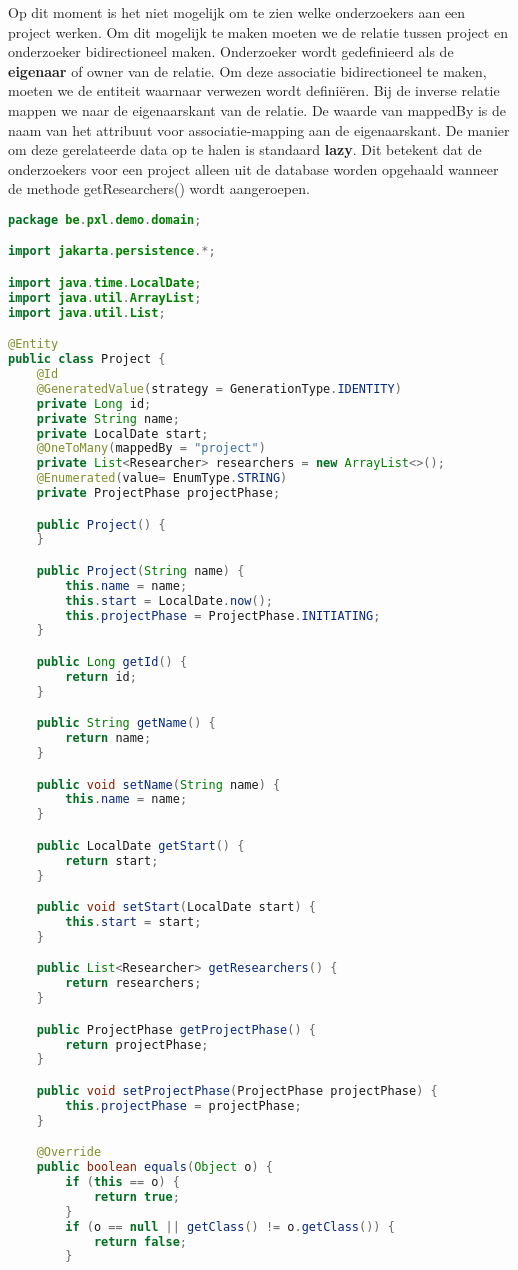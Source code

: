 Op dit moment is het niet mogelijk om te zien welke onderzoekers aan een project werken. Om dit mogelijk te maken moeten we de relatie tussen project en onderzoeker bidirectioneel maken. Onderzoeker wordt gedefinieerd als de \textbf{eigenaar} of owner van de relatie. Om deze associatie bidirectioneel te maken, moeten we de entiteit waarnaar verwezen wordt definiëren.  Bij de inverse relatie mappen we naar de eigenaarskant van de relatie.  De waarde van mappedBy is de naam van het attribuut voor associatie-mapping aan de eigenaarskant.  De manier om deze gerelateerde data op te halen is standaard \textbf{lazy}.  Dit betekent dat de onderzoekers voor een project alleen uit de database worden opgehaald wanneer de methode getResearchers() wordt aangeroepen.


\begin{lstlisting}[frame=single, language=java]
package be.pxl.demo.domain;

import jakarta.persistence.*;

import java.time.LocalDate;
import java.util.ArrayList;
import java.util.List;

@Entity
public class Project {
	@Id
	@GeneratedValue(strategy = GenerationType.IDENTITY)
	private Long id;
	private String name;
	private LocalDate start;
	@OneToMany(mappedBy = "project")
	private List<Researcher> researchers = new ArrayList<>();
	@Enumerated(value= EnumType.STRING)
	private ProjectPhase projectPhase;

	public Project() {
	}

	public Project(String name) {
		this.name = name;
		this.start = LocalDate.now();
		this.projectPhase = ProjectPhase.INITIATING;
	}

	public Long getId() {
		return id;
	}

	public String getName() {
		return name;
	}

	public void setName(String name) {
		this.name = name;
	}

	public LocalDate getStart() {
		return start;
	}

	public void setStart(LocalDate start) {
		this.start = start;
	}

	public List<Researcher> getResearchers() {
		return researchers;
	}

	public ProjectPhase getProjectPhase() {
		return projectPhase;
	}

	public void setProjectPhase(ProjectPhase projectPhase) {
		this.projectPhase = projectPhase;
	}

	@Override
	public boolean equals(Object o) {
		if (this == o) {
			return true;
		}
		if (o == null || getClass() != o.getClass()) {
			return false;
		}


\end{lstlisting}
